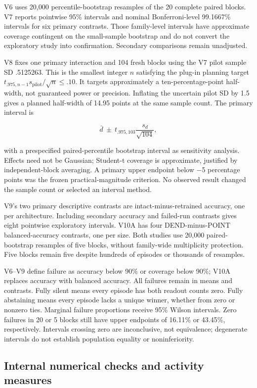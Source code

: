 \documentclass[
  10pt,
]{article}
\begin{document}
V6 uses 20,000 percentile-bootstrap resamples of the 20 complete paired
blocks. V7 reports pointwise 95\% intervals and nominal Bonferroni-level
99.1667\% intervals for six primary contrasts. Those family-level
intervals have approximate coverage contingent on the small-sample
bootstrap and do not convert the exploratory study into confirmation.
Secondary comparisons remain unadjusted.

V8 fixes one primary interaction and 104 fresh blocks using the V7 pilot
sample SD .5125263. This is the smallest integer \(n\) satisfying the
plug-in planning target
\(t_{.975,n-1}s_{\mathrm{pilot}}/\sqrt n\le .10\). It targets
approximately a ten-percentage-point half-width, not guaranteed power or
precision. Inflating the uncertain pilot SD by 1.5 gives a planned
half-width of 14.95 points at the same sample count. The primary
interval is

\[\bar d\ \pm\ t_{.975,103}\frac{s_d}{\sqrt{104}},\]

with a prespecified paired-percentile bootstrap interval as sensitivity
analysis. Effects need not be Gaussian; Student-t coverage is
approximate, justified by independent-block averaging. A primary upper
endpoint below −5 percentage points was the frozen practical-magnitude
criterion. No observed result changed the sample count or selected an
interval method.

V9's two primary descriptive contrasts are intact-minus-retrained
accuracy, one per architecture. Including secondary accuracy and
failed-run contrasts gives eight pointwise exploratory intervals. V10A
has four DEND-minus-POINT balanced-accuracy contrasts, one per size.
Both studies use 20,000 paired-bootstrap resamples of five blocks,
without family-wide multiplicity protection. Five blocks remain five
despite hundreds of episodes or thousands of resamples.

V6--V9 define failure as accuracy below 90\% or coverage below 90\%;
V10A replaces accuracy with balanced accuracy. All failures remain in
means and contrasts. Fully silent means every episode has both readout
counts zero. Fully abstaining means every episode lacks a unique winner,
whether from zero or nonzero ties. Marginal failure proportions receive
95\% Wilson intervals. Zero failures in 20 or 5 blocks still have upper
endpoints of 16.11\% or 43.45\%, respectively. Intervals crossing zero
are inconclusive, not equivalence; degenerate intervals do not establish
population equality or noninferiority.

\subsection{Internal numerical checks and activity
measures}\label{internal-numerical-checks-and-activity-measures}
\end{document}
